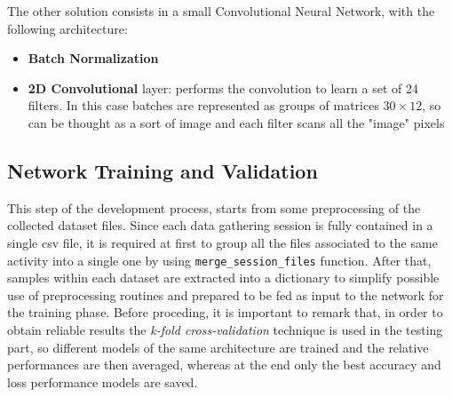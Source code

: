 \inputminted[framesep=1cm, firstline=52, lastline=66, bgcolor=whitesmoke, fontsize=\footnotesize]{python}{code/neural_network.py}
\newpage


The other solution consists in a small Convolutional Neural Network, with the following architecture:
\newline
\noindent
\begin{itemize}
	\item \textbf{Batch Normalization}
	\item \textbf{2D Convolutional} layer: performs the convolution to learn a set of 24 filters. In this case batches are represented as groups of matrices $ 30 \times 12 $, so can be thought as a sort of image and each filter scans all the "image" pixels  
\end{itemize}
\newpage



\subsection{Network Training and Validation}
This step of the development process, starts from some preprocessing of the collected dataset files. Since each data gathering session is fully contained in a single csv file, it is required at first to group all the files associated to the same activity into a single one by using
\texttt{merge_session_files} function.\newline
After that, samples within each dataset are extracted into a dictionary to simplify possible use of preprocessing routines and prepared to be fed as input to the network for the training phase. Before proceding, it is important to remark that, in order to obtain reliable results the \textit{k-fold cross-validation} technique is used in the testing part, so different models of the same architecture are trained and the relative performances are then averaged, whereas at the end only the best accuracy and loss performance models are saved. 


